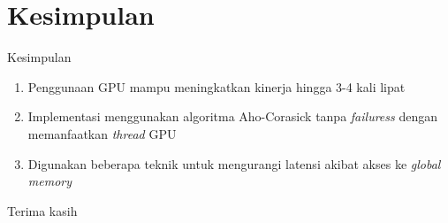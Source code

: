 \documentclass[10pt,xcolor=table]{beamer}
\begin{document}
\section{Kesimpulan}

\begin{frame}{Kesimpulan}

    \begin{enumerate}
        \item Penggunaan GPU mampu meningkatkan kinerja hingga 3-4 kali lipat
        \item Implementasi menggunakan algoritma Aho-Corasick tanpa \emph{failuress} dengan memanfaatkan \emph{thread} GPU
        \item Digunakan beberapa teknik untuk mengurangi latensi akibat akses ke \emph{global memory}
    \end{enumerate}

\end{frame}

\begin{frame}[standout]
    Terima kasih
\end{frame}

\appendix
\end{document}
